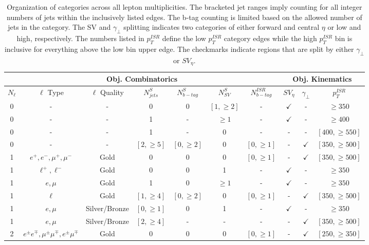 \begin{table}
\caption{Organization of categories across all lepton multiplicities. The bracketed jet ranges imply counting for all integer numbers of jets within the inclusively listed edges. The b-tag counting is limited based on the allowed number of jets in the category. The SV and $\gamma_\perp$ splitting indicates two categories of either forward and central $\eta$ or low and high, respectively. The numbers listed in $p_T^{ISR}$ define the low $p_T^{ISR}$ category edges while the high $p_T^{ISR}$ bin is inclusive for everything above the low bin upper edge. The checkmarks indicate regions that are split by either $\gamma_\perp$ or $SV_\eta$. }
\begin{adjustwidth}{-0.7in}{-1in}

\begin{tabular}{|c|c|c|c|c|c|c|c|c|c|}
\multicolumn{7}{c|}{Obj. Combinatorics} & \multicolumn{3}{c}{Obj. Kinematics} \\
\hline 
$N_\ell$ &  $\ell$ Type & $\ell$ Quality & $N_{jets}^{S}$ & $N_{b-tag}^{S}$ & $N_{SV}^S$ & $N_{b-tag}^{ISR}$ & $SV_\eta$ & $\gamma_\perp$ & $p_T^{ISR}$ \\ 
\hline
\hline 
0 & - & - & 0 & 0 & $[1,\geq 2]$ & - & $\checkmark$ & - & $\geq 350$ \\ 
0 & - & - & 1 & - & $\geq 1$ &    - & $\checkmark$ & - & $\geq 400$ \\
0 & - & - & 1 & - &  0       &    - &  -           & - & $[400,\geq 550]$ \\
0 & - & - & $[2,\geq 5]$ & $[0,\geq 2]$ & 0 & $[0,\geq 1]$ & - & $\checkmark$ & $[350,\geq500]$ \\
\hline 
1 & $e^+,e^-,\mu^+,\mu^-$& Gold & 0 & 0 & 0 & $[0,\geq 1]$ & - & $\checkmark$ & $[350, \geq 500]$ \\
1 & $\ell^+, \ell^-$  & Gold & 0 & 0 & 1 & - & $\checkmark$ & - & $\geq 350$ \\
1 & $e, \mu$ & Gold & 1 & 0 &  $\geq 1$ & - & $\checkmark$ & - & $\geq 350$ \\
1 & $\ell$ & Gold & $[1,\geq 4]$ & $[0,\geq 2]$ & 0 & $[0,\geq 1]$ & - & $\checkmark$ & $[350, \geq 500]$ \\
1 & $e, \mu$ & Silver/Bronze & $[0,\geq 1]$ & 0 & 1 & - & $\checkmark$ & - & $\geq 350$ \\
1 & $e, \mu$ & Silver/Bronze & $[2, \geq 4]$ & - & - & - & - & $\checkmark$ & $[350, \geq 500]$ \\
\hline
2 & $e^\pm e^\mp, \mu^\pm \mu^\mp, e^\pm \mu^\mp $ & Gold & 0 & 0 & 0 & $[0,\geq 1]$ & - & $\checkmark$ & $[250,\geq350]$  \\

\end{tabular}
\end{adjustwidth}
\end{table}
